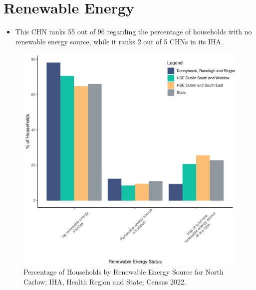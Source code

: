 \documentclass{article}
\begin{document}
\section{Renewable Energy}\label{sect:RE}
\begin{itemize}
\item This CHN ranks  55 out of 96 regarding the percentage of households with no renewable energy source, while it ranks   2 out of 5 CHNs in its IHA.
\end{itemize}
\begin{figure}[H]
	\centering
	\includegraphics[width = 140mm]{../figures/RenewableEnergyED.pdf}
	\caption{Percentage of Households by Renewable Energy Source for North Carlow; IHA, Health Region and State; Census 2022.}
	\label{fig:vbnv}
	\end{figure}
\end{document}
